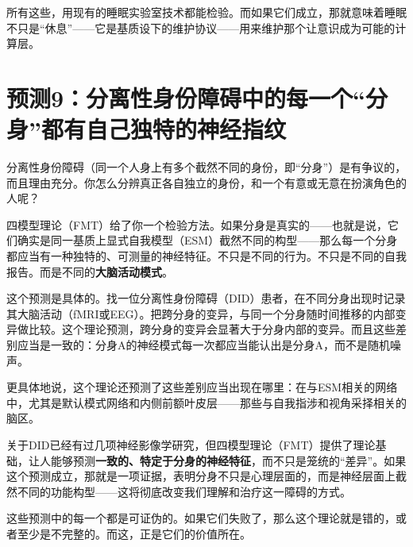 \documentclass[11pt, twoside, openright]{book}
\begin{document}
所有这些，用现有的睡眠实验室技术都能检验。而如果它们成立，那就意味着睡眠不只是“休息”------它是基质设下的维护协议------用来维护那个让意识成为可能的计算层。

\section*{预测9：分离性身份障碍中的每一个“分身”都有自己独特的神经指纹}

分离性身份障碍（同一个人身上有多个截然不同的身份，即“分身”）是有争议的，而且理由充分。你怎么分辨真正各自独立的身份，和一个有意或无意在扮演角色的人呢？

四模型理论（FMT）给了你一个检验方法。如果分身是真实的------也就是说，它们确实是同一基质上显式自我模型（ESM）截然不同的构型------那么每一个分身都应当有一种独特的、可测量的神经特征。不只是不同的行为。不只是不同的自我报告。而是不同的\textbf{大脑活动模式}。

这个预测是具体的。找一位分离性身份障碍（DID）患者，在不同分身出现时记录其大脑活动（fMRI或EEG）。把跨分身的变异，与同一个分身随时间推移的内部变异做比较。这个理论预测，跨分身的变异会显著大于分身内部的变异。而且这些差别应当是一致的：分身A的神经模式每一次都应当能认出是分身A，而不是随机噪声。

更具体地说，这个理论还预测了这些差别应当出现在哪里：在与ESM相关的网络中，尤其是默认模式网络和内侧前额叶皮层------那些与自我指涉和视角采择相关的脑区。

关于DID已经有过几项神经影像学研究，但四模型理论（FMT）提供了理论基础，让人能够预测\textbf{一致的、特定于分身的神经特征}，而不只是笼统的“差异”。如果这个预测成立，那就是一项证据，表明分身不只是心理层面的，而是神经层面上截然不同的功能构型------这将彻底改变我们理解和治疗这一障碍的方式。

这些预测中的每一个都是可证伪的。如果它们失败了，那么这个理论就是错的，或者至少是不完整的。而这，正是它们的价值所在。
\end{document}
